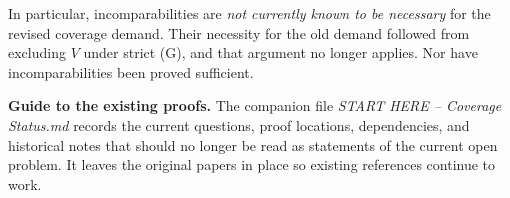 \documentclass[11pt]{article}
\theoremstyle{remark}\newtheorem{remark}[theorem]{Remark}
\begin{document}
In particular, incomparabilities are \emph{not currently known to be
necessary} for the revised coverage demand. Their necessity for the old
demand followed from excluding $V$ under strict (G), and that argument
no longer applies. Nor have incomparabilities been proved sufficient.

\medskip\noindent
\textbf{Guide to the existing proofs.} The companion file
\emph{START HERE -- Coverage Status.md} records the current questions,
proof locations, dependencies, and historical notes that should no longer
be read as statements of the current open problem. It leaves the original
papers in place so existing references continue to work.
\end{document}
